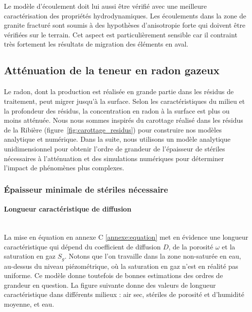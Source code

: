 \documentclass{article}
\begin{document}
Le modèle d’écoulement doit lui aussi être vérifié avec une meilleure caractérisation des propriétés hydrodynamiques. Les écoulements dans la zone de granite fracturé sont soumis à des hypothèses d’anisotropie forte qui doivent être vérifiées sur le terrain. Cet aspect est particulièrement sensible car il contraint très fortement les résultats de migration des éléments en aval.


\subsection{Atténuation de la teneur en radon gazeux}

\paragraph{} Le radon, dont la production est réalisée en grande partie dans les résidus de traitement, peut migrer jusqu’à la surface. Selon les caractéristiques du milieu et la profondeur des résidus, la concentration en radon à la surface est plus ou moins atténuée. Nous nous sommes inspirés du carottage réalisé dans les résidus de la Ribière (figure~\ref{fig:carottage_residus}) pour construire nos modèles analytique et numérique. Dans la suite, nous utilisons un modèle analytique unidimensionnel pour obtenir l'ordre de grandeur de l'épaisseur de stériles nécessaires à l'atténuation et des simulations numériques pour déterminer l'impact de phénomènes plus complexes.

\subsubsection{Épaisseur minimale de stériles nécessaire}

\paragraph{Longueur caractéristique de diffusion \\ \\} La mise en équation en annexe C \ref{annexe:equation} met en évidence une longueur caractéristique qui dépend du coefficient de diffusion $D$, de la porosité $\omega$ et la saturation en gaz $S_g$. Notons que l’on travaille dans la zone non-saturée en eau, au-dessus du niveau piézométrique, où la saturation en gaz n’est en réalité pas uniforme. Ce modèle donne toutefois de bonnes estimations des ordres de grandeur en question. La figure suivante donne des valeurs de longueur caractéristique dans différents milieux : air sec, stériles de porosité et d'humidité moyenne, et eau.
\end{document}
